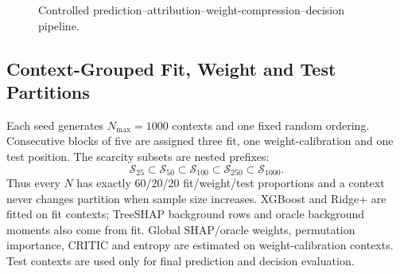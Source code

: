 \documentclass[runningheads]{llncs}
\newcommand{\TOPSIS}{TOPSIS}
\begin{document}
\begin{figure}[t]
\centering
{}
\caption{Controlled prediction--attribution--weight-compression--decision pipeline.}
\label{fig:pipeline}
\end{figure}

\subsection{Context-Grouped Fit, Weight and Test Partitions}

Each seed generates $N_{\max}=1000$ contexts and one fixed random ordering. Consecutive blocks
of five are assigned three fit, one weight-calibration and one test position. The scarcity
subsets are nested prefixes:
\begin{equation}
\mathcal S_{25}\subset\mathcal S_{50}\subset\mathcal S_{100}
\subset\mathcal S_{250}\subset\mathcal S_{1000}.
\label{eq:nesting}
\end{equation}
Thus every $N$ has exactly 60/20/20 fit/weight/test proportions and a context never changes
partition when sample size increases. XGBoost and Ridge+ are fitted on fit contexts; TreeSHAP
background rows and oracle background moments also come from fit. Global SHAP/oracle weights,
permutation importance, CRITIC and entropy are estimated on weight-calibration contexts. Test
contexts are used only for final prediction and decision evaluation.
\end{document}
